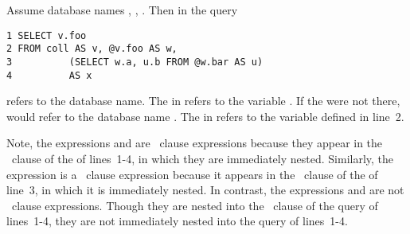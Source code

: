 \begin{example}
Assume database names , , . Then in the query

\begin{verbatim}
1 SELECT v.foo
2 FROM coll AS v, @v.foo AS w, 
3          (SELECT w.a, u.b FROM @w.bar AS u)
4          AS x
\end{verbatim}

\noindent  {} refers to the database name. The  in  refers to the variable . If the  were not there,  would refer to the database name . The  in  refers to the variable defined in line~2. 

Note, the expressions  and  are \from\ clause expressions because they appear in the \from\ clause of the  of lines~1-4, in which they are immediately nested. Similarly, the expression  is a \from\ clause expression because it appears in the \from\ clause of the  of line~3, in which it is immediately nested. In contrast, the expressions  and  are not \from\ clause expressions. Though they are nested into the \from\ clause of the query of lines~1-4, they are not immediately nested into the query of lines~1-4. 
\end{example}

